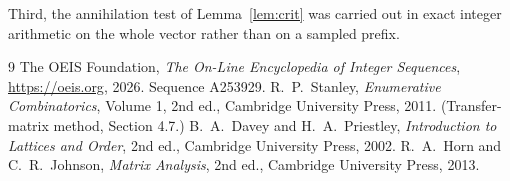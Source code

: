 \documentclass[11pt,a4paper]{article}
\theoremstyle{plain}
\theoremstyle{definition}
\begin{document}
Third, the annihilation test of Lemma~\ref{lem:crit} was carried out in exact integer
arithmetic on the whole vector rather than on a sampled prefix.

\begin{thebibliography}{9}
 The OEIS Foundation, \emph{The On-Line Encyclopedia of Integer
Sequences}, \url{https://oeis.org}, 2026. Sequence A253929.
 R.~P.~Stanley, \emph{Enumerative Combinatorics}, Volume 1, 2nd ed.,
Cambridge University Press, 2011. (Transfer-matrix method, Section 4.7.)
 B.~A.~Davey and H.~A.~Priestley, \emph{Introduction to Lattices and
Order}, 2nd ed., Cambridge University Press, 2002.
 R.~A.~Horn and C.~R.~Johnson, \emph{Matrix Analysis}, 2nd ed., Cambridge
University Press, 2013.
\end{thebibliography}
\end{document}
